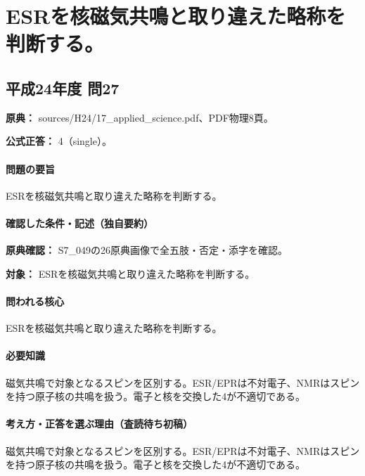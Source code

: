 \section{ESRを核磁気共鳴と取り違えた略称を判断する。}

\subsection{平成24年度 問27}
\label{q:h24-reg-applied-27}

\noindent\textbf{原典：} sources/H24/17\_applied\_science.pdf、PDF物理8頁。

\textbf{公式正答：} 4（single）。

\paragraph{問題の要旨} ESRを核磁気共鳴と取り違えた略称を判断する。

\paragraph{確認した条件・記述（独自要約）}\mbox{}\par

\noindent\textbf{原典確認：} S7\_049の26原典画像で全五肢・否定・添字を確認。\par

\noindent\textbf{対象：} ESRを核磁気共鳴と取り違えた略称を判断する。\par

\paragraph{問われる核心} ESRを核磁気共鳴と取り違えた略称を判断する。

\paragraph{必要知識} 磁気共鳴で対象となるスピンを区別する。ESR/EPRは不対電子、NMRはスピンを持つ原子核の共鳴を扱う。電子と核を交換した4が不適切である。

\paragraph{考え方・正答を選ぶ理由（査読待ち初稿）} 磁気共鳴で対象となるスピンを区別する。ESR/EPRは不対電子、NMRはスピンを持つ原子核の共鳴を扱う。電子と核を交換した4が不適切である。

